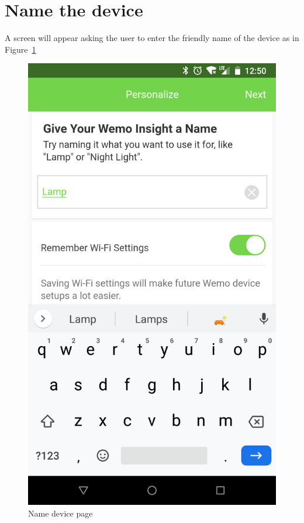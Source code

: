 \section{Name the device}
A screen will appear asking the user to enter the friendly name of the device as in Figure~\ref{fig:nameDevice}
\begin{figure}[H]
\centering
\includegraphics[scale=0.09]{figs/wemoApp/nameDevice.png}
\caption{Name device page}
\label{fig:nameDevice}
\end{figure}

